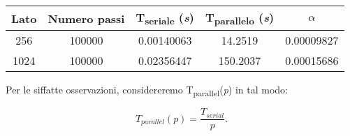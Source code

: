 \begin{center}
\begin{tabular}{ccccc}
 \hline
 Lato & Numero passi & T\textsubscript{seriale} (\textit{s}) &
 T\textsubscript{parallelo} (\textit{s})& $\alpha$ \\
 \hline
 256 & 100000 & 0.00140063 & 14.2519 & 0.00009827 \\
 1024 & 100000 & 0.02356447 & 150.2037 & 0.00015686 \\
 \hline
\end{tabular}
\end{center}

Per le siffatte osservazioni, considereremo
T\textsubscript{parallel}(\textit{p}) in tal modo:

\[ 
T_{parallel}(p) = \frac{T_{serial}}{p}.
\]
